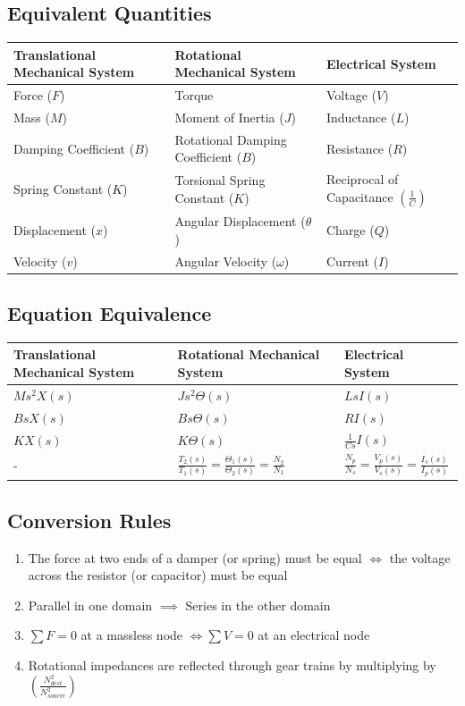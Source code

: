\subsection*{Equivalent Quantities}
\begin{center}
  \begin{tabularx}{\textwidth}{XXX}
    \hline
    Translational Mechanical System & Rotational Mechanical System & Electrical System \\
    \hline
    Force ($F$) & Torque & Voltage ($V$)\\
    Mass ($M$) & Moment of Inertia ($J$) & Inductance ($L$)\\
    Damping Coefficient ($B$) & Rotational Damping Coefficient ($B$) & Resistance ($R$)\\
    Spring Constant ($K$) & Torsional Spring Constant ($K$) & Reciprocal of Capacitance $\left( \frac{1}{C} \right)$\\
    Displacement ($x$) & Angular Displacement ($\theta$) & Charge ($Q$)\\
    Velocity ($v$) & Angular Velocity ($\omega$) & Current ($I$)
  \end{tabularx}
\end{center}
\subsection*{Equation Equivalence}
\begin{center}
  \begin{tabularx}{\textwidth}{XXX}
    \hline
    Translational Mechanical System & Rotational Mechanical System & Electrical System \\
    \hline
    $Ms^2X(s)$ & $Js^2\Theta(s)$ & $LsI(s)$\\
    $BsX(s)$ & $Bs\Theta(s)$ & $RI(s)$\\
    $KX(s)$ & $K\Theta(s)$ & $\frac{1}{Cs}I(s)$\\
    - & $\frac{T_2(s)}{T_1(s)}=\frac{\Theta_1(s)}{\Theta_2(s)}=\frac{N_2}{N_1}$ & $\frac{N_p}{N_s}=\frac{V_p(s)}{V_s(s)}=\frac{I_s(s)}{I_p(s)}$\\
  \end{tabularx}
\end{center}
\subsection*{Conversion Rules}
\begin{enumerate}
  \item The force at two ends of a damper (or spring) must be equal $\Leftrightarrow$ the voltage across the resistor (or capacitor) must be equal
  \item Parallel in one domain $\implies$ Series in the other domain
  \item $\sum F = 0$ at a massless node $\Leftrightarrow \sum V = 0$ at an electrical node
  \item Rotational impedances are reflected through gear trains by multiplying by $\left( \frac{N^2_{dest}}{N^2_{source}} \right)$
\end{enumerate}
